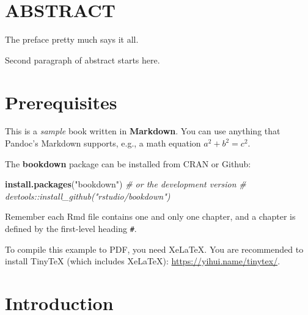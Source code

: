 \documentclass[10pt,twoside,letterpaper]{phstylee}
\newenvironment{Shaded}{\begin{snugshade}}{\end{snugshade}}
\newcommand{\CommentTok}[1]{\textcolor[rgb]{0.56,0.35,0.01}{\textit{#1}}}
\newcommand{\KeywordTok}[1]{\textcolor[rgb]{0.13,0.29,0.53}{\textbf{#1}}}
\newcommand{\NormalTok}[1]{#1}
\newcommand{\StringTok}[1]{\textcolor[rgb]{0.31,0.60,0.02}{#1}}
\begin{document}
\chapter*{ABSTRACT}
The preface pretty much says it all.

Second paragraph of abstract starts here.
\cleardoublepage




{
\setcounter{tocdepth}{1}
{}
\renewcommand\contentsname{CONTENIDO}
\tableofcontents
}

\renewcommand\listfigurename{ÍNDICE DE FIGURAS}
\listoffigures
\cleardoublepage

\renewcommand\listtablename{ÍNDICE DE TABLAS}
\listoftables
\cleardoublepage

\pagestyle{fancy}

\hypertarget{prerequisites}{%
\chapter*{Prerequisites}\label{prerequisites}}

This is a \emph{sample} book written in \textbf{Markdown}. You can use anything that Pandoc's Markdown supports, e.g., a math equation \(a^2 + b^2 = c^2\).

The \textbf{bookdown} package can be installed from CRAN or Github:

\begin{Shaded}
\begin{Highlighting}[]
\KeywordTok{install.packages}\NormalTok{(}\StringTok{"bookdown"}\NormalTok{)}
\CommentTok{# or the development version}
\CommentTok{# devtools::install_github("rstudio/bookdown")}
\end{Highlighting}
\end{Shaded}

Remember each Rmd file contains one and only one chapter, and a chapter is defined by the first-level heading \texttt{\#}.

To compile this example to PDF, you need XeLaTeX. You are recommended to install TinyTeX (which includes XeLaTeX): \url{https://yihui.name/tinytex/}.

\hypertarget{intro}{%
\chapter{Introduction}\label{intro}}
\end{document}
